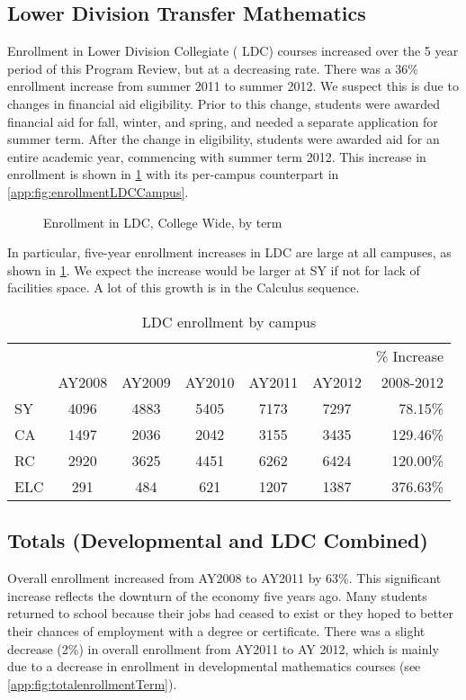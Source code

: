 \subsection{Lower Division Transfer Mathematics}
Enrollment in Lower Division Collegiate ( LDC) courses increased over the 5 year period of this Program Review, but at a decreasing rate. There was a 36\% enrollment increase from summer 2011 to summer 2012. We suspect this is due to changes in financial aid eligibility. Prior to this change, students were awarded financial aid for fall, winter, and spring, and needed a separate application for summer term.  After the change in eligibility, students were awarded aid for an entire academic year, commencing with summer term 2012.  This increase in enrollment is shown in \cref{needs:fig:enrollmentLDCTerm} with its per-campus counterpart in \vref{app:fig:enrollmentLDCCampus}.

\begin{figure}[!htb]
	\centering
	
	\caption{Enrollment in LDC, College Wide, by term}
	\label{needs:fig:enrollmentLDCTerm}
\end{figure}

In particular, five-year enrollment increases  in LDC are large at all campuses, as shown in \cref{needs:tab:LDCenrollmentCampus}.  We expect the increase would be larger at SY if not for lack of facilities space. A lot of this growth is in the Calculus sequence.   

\begin{table}[!htb]
	\centering
	\caption{LDC enrollment by campus}
	\label{needs:tab:LDCenrollmentCampus}
	\begin{tabular}{l*{5}{c}r}
		\toprule
		    &        &        &        &        &        & \% Increase \\
		    & AY2008 & AY2009 & AY2010 & AY2011 & AY2012 & 2008-2012   \\
		\midrule
		SY  & 4096   & 4883   & 5405   & 7173   & 7297   & 78.15\%     \\
		CA  & 1497   & 2036   & 2042   & 3155   & 3435   & 129.46\%    \\
		RC  & 2920   & 3625   & 4451   & 6262   & 6424   & 120.00\%    \\
		ELC & 291    & 484    & 621    & 1207   & 1387   & 376.63\%    \\
		\bottomrule
	\end{tabular}
\end{table}

\subsection{Totals (Developmental and LDC Combined)}
Overall enrollment increased from AY2008 to AY2011 by 63\%. This significant increase reflects the downturn of the economy five years ago. Many students returned to school because their jobs had ceased to exist or they hoped to better their chances of employment with a degree or certificate. There was a slight decrease (2\%) in overall enrollment from AY2011 to AY 2012, which is mainly due to a decrease in enrollment in developmental mathematics courses (see \vref{app:fig:totalenrollmentTerm}).


